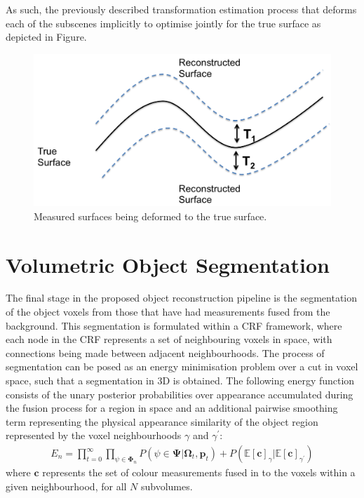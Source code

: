 As such, the previously described transformation estimation process that deforms each of the subscenes implicitly to optimise jointly for the true 
surface as depicted in Figure.
\begin{figure}[!t]
	\centering
	\includegraphics[scale=0.25]{deformation.png}
	\caption{Measured surfaces being deformed to the true surface.}
	\label{deformationDiagram}
\end{figure}


\section{Volumetric Object Segmentation}
The final stage in the proposed object reconstruction pipeline is the segmentation of the object voxels from those that have had measurements fused 
from the background. This segmentation is formulated within a CRF framework, where each node in the CRF represents a set of neighbouring voxels in space, 
with connections being made between adjacent neighbourhoods. The process of segmentation can be posed as an energy minimisation problem over a cut in voxel space, 
such that a segmentation in 3D is obtained. The following energy function consists of the unary posterior probabilities over appearance accumulated during the fusion 
process for a region in space and an additional pairwise smoothing term representing the physical appearance similarity of the object region represented by the voxel 
neighbourhoods $\gamma$ and $\gamma^{'}$:
\begin{equation}
\begin{split}
E_{n} = \prod_{t=0}^{\infty} \prod_{\psi \in \mathbf{\Phi}_{n}} P(\psi \in \mathbf{\Psi} | \mathbf{\Omega}_{t}, \mathbf{p}_{t}) + P(\mathbb{E}[\mathbf{c}]_{\gamma} | \mathbb{E}[\mathbf{c}]_{\gamma^{'}})
\end{split}
\end{equation}
where $\mathbf{c}$ represents the set of colour measurements fused in to the voxels within a given neighbourhood, for all $N$ subvolumes.

